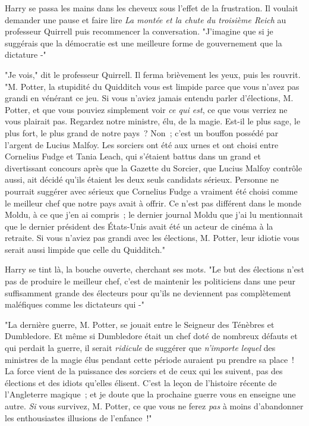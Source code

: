 Harry se passa les mains dans les cheveux sous l'effet de la frustration. Il voulait demander une pause et faire lire \emph{La montée et la chute du troisième Reich} au professeur Quirrell puis recommencer la conversation. "J'imagine que si je suggérais que la démocratie est une meilleure forme de gouvernement que la dictature -"

"Je vois," dit le professeur Quirrell. Il ferma brièvement les yeux, puis les rouvrit. "M. Potter, la stupidité du Quidditch vous est limpide parce que vous n'avez pas grandi en vénérant ce jeu. Si vous n'aviez jamais entendu parler d'élections, M. Potter, et que vous pouviez simplement voir \emph{ce qui est}, ce que vous verriez ne vous plairait pas. Regardez notre ministre, élu, de la magie. Est-il le plus sage, le plus fort, le plus grand de notre pays~? Non~; c'est un bouffon possédé par l'argent de Lucius Malfoy. Les sorciers ont été aux urnes et ont choisi entre Cornelius Fudge et Tania Leach, qui s'étaient battus dans un grand et divertissant concours après que la Gazette du Sorcier, que Lucius Malfoy contrôle aussi, ait décidé qu'ils étaient les deux seuls candidats sérieux. Personne ne pourrait suggérer avec sérieux que Cornelius Fudge a vraiment été choisi comme le meilleur chef que notre pays avait à offrir. Ce n'est pas différent dans le monde Moldu, à ce que j'en ai compris~; le dernier journal Moldu que j'ai lu mentionnait que le dernier président des États-Unis avait été un acteur de cinéma à la retraite. Si vous n'aviez pas grandi avec les élections, M. Potter, leur idiotie vous serait aussi limpide que celle du Quidditch."

Harry se tint là, la bouche ouverte, cherchant ses mots. "Le but des élections n'est pas de produire le meilleur chef, c'est de maintenir les politiciens dans une peur suffisamment grande des électeurs pour qu'ils ne deviennent pas complètement maléfiques comme les dictateurs qui -"

"La dernière guerre, M. Potter, se jouait entre le Seigneur des Ténèbres et Dumbledore. Et même si Dumbledore était un chef doté de nombreux défauts et qui perdait la guerre, il serait \emph{ridicule} de suggérer que \emph{n'importe lequel} des ministres de la magie élus pendant cette période auraient pu prendre sa place~! La force vient de la puissance des sorciers et de ceux qui les suivent, pas des élections et des idiots qu'elles élisent. C'est la leçon de l'histoire récente de l'Angleterre magique~; et je doute que la prochaine guerre vous en enseigne une autre. \emph{Si} vous survivez, M. Potter, ce que vous ne ferez \emph{pas} à moins d'abandonner les enthousiastes illusions de l'enfance~!"

